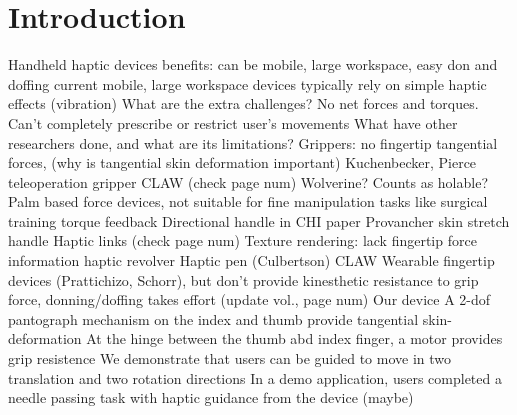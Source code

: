 \section{Introduction}

\begin{outline}
    \1 Handheld haptic devices
        \2 benefits: can be mobile, large workspace, easy don and doffing
        \2 current mobile, large workspace devices typically rely on simple haptic effects (vibration)
    \1 What are the extra challenges?
        \2 No net forces and torques.
        \2 Can't completely prescribe or restrict user's movements 
    \1 What have other researchers done, and what are its limitations?
        \2 Grippers: no fingertip tangential forces, (why is tangential skin deformation important)
            \3 Kuchenbecker, Pierce teleoperation gripper \cite{Pierce2014}
            \3 CLAW \cite{Choi2018} (check page num)
            \3 Wolverine? Counts as holable?
        \2 Palm based force devices, not suitable for fine manipulation tasks like surgical training
            \3 \cite{Walker2017} torque feedback 
            \3 Directional handle in CHI paper
            \3 Provancher skin stretch handle \cite{Gleeson2009}
            \3 Haptic links \cite{Strasnick2018} (check page num)
        \2 Texture rendering: lack fingertip force information
            \3 haptic revolver \cite{Whitmire2018}
            \3 Haptic pen (Culbertson)
            \3 CLAW
        \2 Wearable fingertip devices (Prattichizo, Schorr), but don't provide kinesthetic resistance to grip force, donning/doffing takes effort \cite{Pacchierotti2017} (update vol., page num)
    \1 Our device 
        \2 A 2-dof pantograph mechanism on the index and thumb provide tangential skin-deformation 
        \2 At the hinge between the thumb abd index finger, a motor provides grip resistence 
        \2 We demonstrate that users can be guided to move in two translation and two rotation directions
        \2 In a demo application, users completed a needle passing task with haptic guidance from the device (maybe)

\end{outline}

